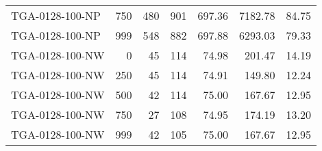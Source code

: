 \begin{table}[htbp]
{\begin{tabular}{lrrrrrr}
    TGA-0128-100-NP & 750    & 480    & 901    & 697.36 & 7182.78 & 84.75 \\
    TGA-0128-100-NP & 999    & 548    & 882    & 697.88 & 6293.03 & 79.33 \\ \hline
    TGA-0128-100-NW & 0      & 45     & 114    & 74.98  & 201.47 & 14.19 \\
    TGA-0128-100-NW & 250    & 45     & 114    & 74.91  & 149.80 & 12.24 \\
    TGA-0128-100-NW & 500    & 42     & 114    & 75.00  & 167.67 & 12.95 \\
    TGA-0128-100-NW & 750    & 27     & 108    & 74.95  & 174.19 & 13.20 \\
    TGA-0128-100-NW & 999    & 42     & 105    & 75.00  & 167.67 & 12.95 \\
    \bottomrule
    \end{tabular}}
  \label{tab:addlabel}%
\end{table}%
